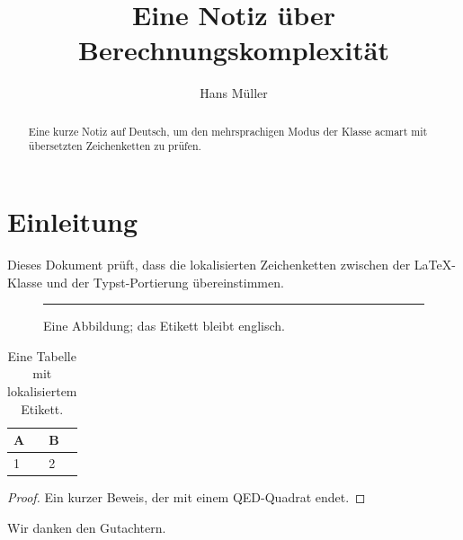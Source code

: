\documentclass[acmsmall,language=german]{acmart}
\begin{document}
\title{Eine Notiz über Berechnungskomplexität}

\author{Hans Müller}

\renewcommand{\shortauthors}{Müller}

\begin{abstract}
  Eine kurze Notiz auf Deutsch, um den mehrsprachigen Modus der Klasse acmart mit
  übersetzten Zeichenketten zu prüfen.
\end{abstract}


\maketitle

\section{Einleitung}
Dieses Dokument prüft, dass die lokalisierten Zeichenketten zwischen der
LaTeX-Klasse und der Typst-Portierung übereinstimmen.

\begin{figure}[h]
\centering
\rule{4cm}{2cm}
\caption{Eine Abbildung; das Etikett bleibt englisch.}
\end{figure}

\begin{table}[h]
\caption{Eine Tabelle mit lokalisiertem Etikett.}
\centering
\begin{tabular}{ll}
\toprule
A & B\\
\midrule
1 & 2\\
\bottomrule
\end{tabular}
\end{table}

\begin{proof}
Ein kurzer Beweis, der mit einem QED-Quadrat endet.
\end{proof}

\begin{acks}
Wir danken den Gutachtern.
\end{acks}
\end{document}
